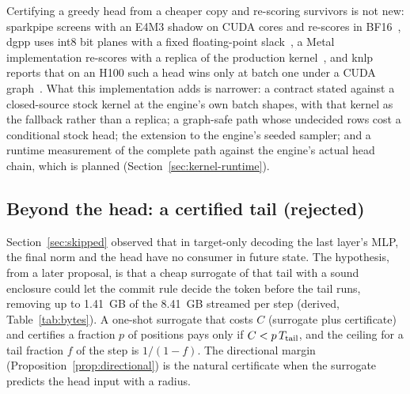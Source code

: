 

Certifying a greedy head from a cheaper copy and re-scoring survivors is not new: sparkpipe screens with an E4M3 shadow on CUDA cores and re-scores in BF16~\cite{sparkpipehead}, dgpp uses int8 bit planes with a fixed floating-point slack~\cite{dgpphead}, a Metal implementation re-scores with a replica of the production kernel~\cite{lagunaprune}, and knlp reports that on an H100 such a head wins only at batch one under a CUDA graph~\cite{knlphead}. What this implementation adds is narrower: a contract stated against a closed-source stock kernel at the engine's own batch shapes, with that kernel as the fallback rather than a replica; a graph-safe path whose undecided rows cost a conditional stock head; the extension to the engine's seeded sampler; and a runtime measurement of the complete path against the engine's actual head chain, which is planned (Section~\ref{sec:kernel-runtime}).

\subsection{Beyond the head: a certified tail (rejected)}\label{sec:tail}
Section~\ref{sec:skipped} observed that in target-only decoding the last layer's MLP, the final norm and the head have no consumer in future state. The hypothesis, from a later proposal, is that a cheap surrogate of that tail with a sound enclosure could let the commit rule decide the token before the tail runs, removing up to 1.41~GB of the 8.41~GB streamed per step (derived, Table~\ref{tab:bytes}). A one-shot surrogate that costs $C$ (surrogate plus certificate) and certifies a fraction $p$ of positions pays only if $C<p\,T_{\rm tail}$, and the ceiling for a tail fraction $f$ of the step is $1/(1-f)$. The directional margin (Proposition~\ref{prop:directional}) is the natural certificate when the surrogate predicts the head input with a radius.


